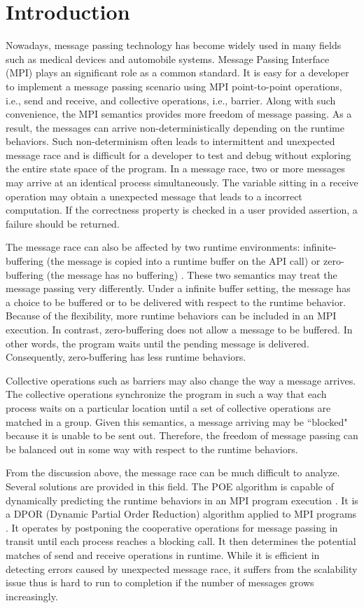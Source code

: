 \section{Introduction}
Nowadays, message passing technology has become widely used in many fields such as medical devices and automobile systems. Message Passing Interface (MPI) plays an significant role as a common standard. It is easy for a developer to implement a message passing scenario using MPI point-to-point operations, i.e., send and receive, and collective operations, i.e., barrier. Along with such convenience, the MPI semantics provides more freedom of message passing. As a result, the messages can arrive non-deterministically depending on the runtime behaviors. Such non-determinism often leads to intermittent and unexpected message race and is difficult for a developer to test and debug without exploring the entire state space of the program. In a message race, two or more messages may arrive at an identical process simultaneously. The variable sitting in a receive operation may obtain a unexpected message that leads to a incorrect computation. If the correctness property is checked in a user provided assertion, a failure should be returned. 

The message race can also be affected by two runtime environments: infinite-buffering (the message is copied into a runtime buffer on the API call) or zero-buffering (the message has no buffering) \cite{}. These two semantics may treat the message passing very differently. Under a infinite buffer setting, the message has a choice to be buffered or to be delivered with respect to the runtime behavior. Because of the flexibility, more runtime behaviors can be included in an MPI execution. In contrast, zero-buffering does not allow a message to be buffered. In other words, the program waits until the pending message is delivered. Consequently, zero-buffering has less runtime behaviors.

Collective operations such as barriers may also change the way a message arrives. The collective operations synchronize the program in such a way that each process waits on a particular location until a set of collective operations are matched in a group. Given this semantics, a message arriving may be ``blocked" because it is unable to be sent out. Therefore, the freedom of message passing can be balanced out in some way with respect to the runtime behaviors. 

From the discussion above, the message race can be much difficult to analyze. Several solutions are provided in this field. The POE algorithm is capable of dynamically predicting the runtime behaviors in an MPI program execution \cite{}. It is a DPOR (Dynamic Partial Order Reduction) algorithm applied to MPI programs \cite{}. It operates by postponing the cooperative operations for message passing in transit until each process reaches a blocking call. It then determines the potential matches of send and receive operations in runtime. While it is efficient in detecting errors caused by unexpected message race, it suffers from the scalability issue thus is hard to run to completion if the number of messages grows increasingly. 

